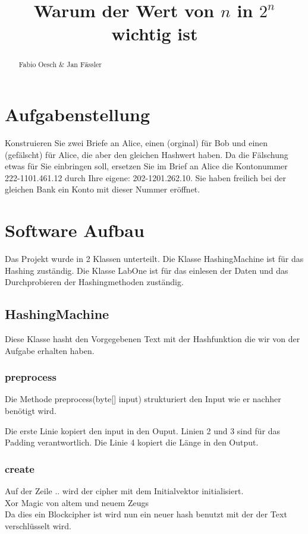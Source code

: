 \documentclass[12pt]{scrartcl}
\title{Warum der Wert von $n$ in $2^n$ wichtig ist}
\begin{document}
 \maketitle
 \thispagestyle{firststyle}
 \pagestyle{firststyle}
 \begin{abstract}
 \begin{center}
  Fabio Oesch \& Jan Fässler
 \end{center}
 \vspace{0.5cm}
\hrulefill
\end{abstract}

 \pagestyle{documentstyle}
 \tableofcontents
 \pagebreak
\section{Aufgabenstellung}
Konstruieren Sie zwei Briefe an Alice, einen (orginal) für Bob und einen (gefälscht) für Alice, die aber den gleichen Hashwert haben. Da die Fälschung etwas für Sie einbringen soll, ersetzen Sie im Brief an Alice die Kontonummer 222-1101.461.12 durch Ihre eigene: 202-1201.262.10. Sie haben freilich bei der gleichen Bank ein Konto mit dieser Nummer eröffnet.
\section{Software Aufbau}
Das Projekt wurde in 2 Klassen unterteilt. Die Klasse HashingMachine ist für das Hashing zuständig. Die Klasse LabOne ist für das einlesen der Daten und das Durchprobieren der Hashingmethoden zuständig.
\subsection{HashingMachine}
Diese Klasse hasht den Vorgegebenen Text mit der Hashfunktion die wir von der Aufgabe erhalten haben.
\subsubsection{preprocess}
Die Methode preprocess(byte[] input) strukturiert den Input wie er nachher benötigt wird.

Die erste Linie kopiert den input in den Ouput. Linien 2 und 3 sind für das Padding verantwortlich. Die Linie 4 kopiert die Länge in den Output.
\subsubsection{create}

Auf der Zeile .. wird der cipher mit dem Initialvektor initialisiert.\\
Xor Magic von altem und neuem Zeugs\\
Da dies ein Blockcipher ist wird nun ein neuer hash benutzt mit der der Text verschlüsselt wird.\\
\end{document}
